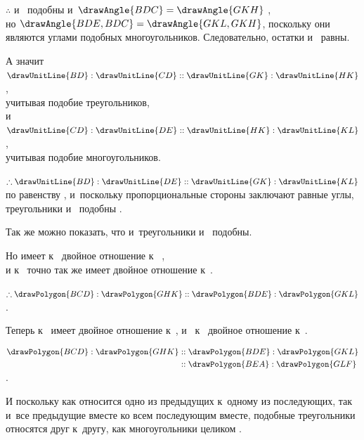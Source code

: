 \documentclass[letters,booklanguage=russian]{byrnebook}
\begin{document}
\begin{center}
$\therefore$  и~ подобны и~$\drawAngle{BDC} = \drawAngle{GKH}$ ,\\
но $\drawAngle{BDE,BDC} = \drawAngle{GKL,GKH}$, поскольку они являются углами подобных многоугольников. Следовательно, остатки  и~ равны.

А значит $\drawUnitLine{BD} : \drawUnitLine{CD} :: \drawUnitLine{GK} : \drawUnitLine{HK}$,\\
учитывая подобие треугольников,\\
и $\drawUnitLine{CD} : \drawUnitLine{DE} :: \drawUnitLine{HK} : \drawUnitLine{KL}$,\\
учитывая подобие многоугольников.

$\therefore \drawUnitLine{BD} : \drawUnitLine{DE} :: \drawUnitLine{GK} : \drawUnitLine{KL}$\\
по равенству , и~поскольку пропорциональные стороны заключают равные углы, треугольники  и~ подобны .

Так же можно показать, что и~треугольники  и~ подобны.

Но  имеет к~ двойное отношение  к~ ,\\
и  к~ точно так же имеет двойное отношение  к~.

$\therefore \drawPolygon{BCD} : \drawPolygon{GHK} :: \drawPolygon{BDE} : \drawPolygon{GKL}$ .

Теперь  к~ имеет двойное отношение  к~, и~ к~ двойное отношение  к~.

$\begin{aligned}
	\drawPolygon{BCD} : \drawPolygon{GHK} &:: \drawPolygon{BDE} : \drawPolygon{GKL} \\
	&:: \drawPolygon{BEA} : \drawPolygon{GLF} \\
\end{aligned}$.
\end{center}

И поскольку как относится одно из предыдущих к~одному из последующих, так и~все предыдущие вместе ко всем последующим вместе, подобные треугольники относятся друг к~другу, как многоугольники целиком .
\end{document}
